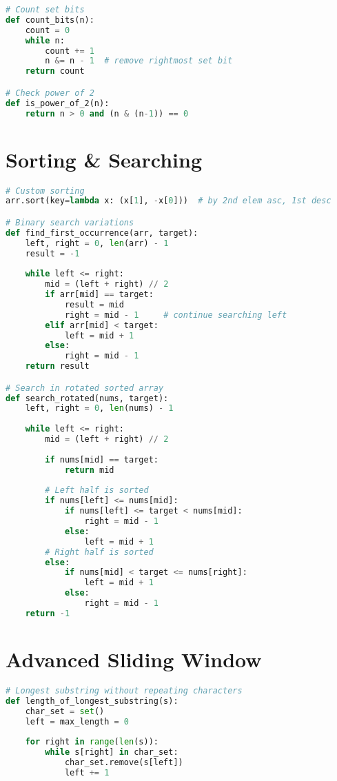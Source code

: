 \documentclass[9pt,a4paper]{article}
\begin{document}
\begin{multicols}{2}
\begin{lstlisting}[language=Python]
# Count set bits
def count_bits(n):
    count = 0
    while n:
        count += 1
        n &= n - 1  # remove rightmost set bit
    return count

# Check power of 2
def is_power_of_2(n):
    return n > 0 and (n & (n-1)) == 0
\end{lstlisting}

\section*{Sorting \& Searching}
\begin{lstlisting}[language=Python]
# Custom sorting
arr.sort(key=lambda x: (x[1], -x[0]))  # by 2nd elem asc, 1st desc

# Binary search variations
def find_first_occurrence(arr, target):
    left, right = 0, len(arr) - 1
    result = -1
    
    while left <= right:
        mid = (left + right) // 2
        if arr[mid] == target:
            result = mid
            right = mid - 1     # continue searching left
        elif arr[mid] < target:
            left = mid + 1
        else:
            right = mid - 1
    return result

# Search in rotated sorted array
def search_rotated(nums, target):
    left, right = 0, len(nums) - 1
    
    while left <= right:
        mid = (left + right) // 2
        
        if nums[mid] == target:
            return mid
        
        # Left half is sorted
        if nums[left] <= nums[mid]:
            if nums[left] <= target < nums[mid]:
                right = mid - 1
            else:
                left = mid + 1
        # Right half is sorted
        else:
            if nums[mid] < target <= nums[right]:
                left = mid + 1
            else:
                right = mid - 1
    return -1
\end{lstlisting}

\section*{Advanced Sliding Window}
\begin{lstlisting}[language=Python]
# Longest substring without repeating characters
def length_of_longest_substring(s):
    char_set = set()
    left = max_length = 0
    
    for right in range(len(s)):
        while s[right] in char_set:
            char_set.remove(s[left])
            left += 1
        

\end{lstlisting}
\end{multicols}
\end{document}
